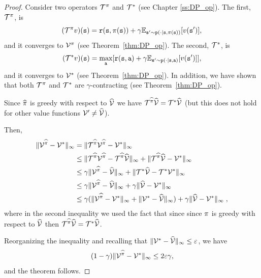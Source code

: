 \begin{proof}
Consider two operators $\mathcal{T}^\pi$ and $\mathcal{T}^*$ (see
Chapter \ref{ss:DP_op}). The first, $\mathcal{T}^\pi$, is
\[
(\mathcal{T}^\pi v)({\tt s})={\tt r}({\tt s},\pi({\tt s}))+\gamma
\mathbb{E}_{{\tt s}'\sim {\tt p}(\cdot|{\tt s},\pi({\tt s}))}[v({\tt s}')],
\]
and it converges to $\mathcal{V}^\pi$ (see Theorem~\ref{thm:DP_op}).
The second, $\mathcal{T}^*$, is
\[
(\mathcal{T}^* v)({\tt s})=\max_{\tt a}[{\tt r}({\tt s},{\tt a})+\gamma
\mathbb{E}_{{\tt s}'\sim {\tt p}(\cdot|{\tt s},{\tt a})}[v({\tt s}')] ],
\]
and it converges to $\mathcal{V}^*$ (see Theorem~\ref{thm:DP_op}).
In addition, we have shown that both
$\mathcal{T}^\pi$ and $\mathcal{T}^*$ are $\gamma$-contracting (see
Theorem~\ref{thm:DP_op}).

Since $\widehat{\pi}$ is greedy with respect to $\widehat{\mathcal{V}}$ we have
$\mathcal{T}^{\widehat{\pi}} \widehat{\mathcal{V}}=\mathcal{T}^* \widehat{\mathcal{V}}$ (but this does not hold for
other value functions $\mathcal{V}' \neq \widehat{\mathcal{V}}$).

Then,
\begin{align*}
\|\mathcal{V}^{\widehat{\pi}}-\mathcal{V}^*\|_\infty &= \|\mathcal{T}^{\widehat{\pi}} \mathcal{V}^{\widehat{\pi}} - \mathcal{V}^*\|_\infty\\
&\leq \|\mathcal{T}^{\widehat{\pi}} \mathcal{V}^{\widehat{\pi}} -\mathcal{T}^{\widehat{\pi}} \widehat{\mathcal{V}}\|_\infty +\|\mathcal{T}^{\widehat{\pi}} \widehat{\mathcal{V}} - \mathcal{V}^*\|_\infty\\
&\leq \gamma\| \mathcal{V}^{\widehat{\pi}} - \widehat{\mathcal{V}}\|_\infty +\|\mathcal{T}^* \widehat{\mathcal{V}} - \mathcal{T}^*\mathcal{V}^*\|_\infty\\
&\leq \gamma\| \mathcal{V}^{\widehat{\pi}} - \widehat{\mathcal{V}}\|_\infty +\gamma\| \widehat{\mathcal{V}} - \mathcal{V}^*\|_\infty\\
&\leq \gamma(\| \mathcal{V}^{\widehat{\pi}} - \mathcal{V}^*\|_\infty+ \|\mathcal{V}^*-\widehat{\mathcal{V}}\|_\infty ) +\gamma\| \widehat{\mathcal{V}} - \mathcal{V}^*\|_\infty\;,
\end{align*}
where in the second inequality we used the fact that since since
$\pi$ is greedy with respect to $\widehat{\mathcal{V}}$ then $\mathcal{T}^{\widehat{\pi}} \widehat{\mathcal{V}}=\mathcal{T}^* \widehat{\mathcal{V}}$.

Reorganizing the inequality and recalling that
$\|\mathcal{V}^*-\widehat{\mathcal{V}}\|_\infty\leq \varepsilon$, we have
\[
(1-\gamma)\|\mathcal{V}^{\widehat{\pi}}-\mathcal{V}^*\|_\infty \leq 2\varepsilon\gamma,
\]
and the theorem follows.
\end{proof}

